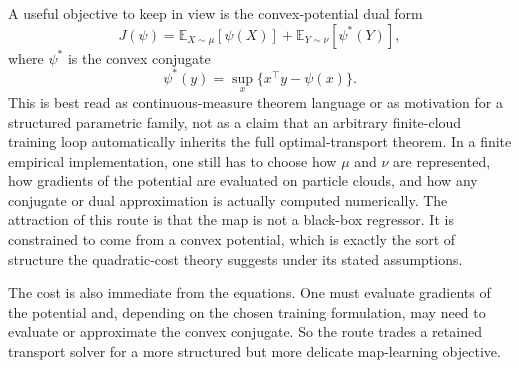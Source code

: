 A useful objective to keep in view is the convex-potential dual form
\begin{equation}
\label{eq:bf-neural-ot-direct-dual-objective}
  J(\psi)
  =
  \mathbb E_{X\sim\mu}[\psi(X)]
  +
  \mathbb E_{Y\sim\nu}[\psi^*(Y)],
\end{equation}
where \(\psi^*\) is the convex conjugate
\begin{equation}
\label{eq:bf-neural-ot-direct-conjugate}
  \psi^*(y)=\sup_x\{x^\top y-\psi(x)\}.
\end{equation}
This is best read as continuous-measure theorem language or as motivation for a
structured parametric family, not as a claim that an arbitrary finite-cloud
training loop automatically inherits the full optimal-transport theorem.  In a
finite empirical implementation, one still has to choose how \(\mu\) and \(\nu\)
are represented, how gradients of the potential are evaluated on particle clouds,
and how any conjugate or dual approximation is actually computed numerically.
The attraction of this route is that the map is not a black-box regressor.  It is
constrained to come from a convex potential, which is exactly the sort of
structure the quadratic-cost theory suggests under its stated assumptions.

The cost is also immediate from the equations.  One must evaluate gradients of
the potential and, depending on the chosen training formulation, may need to
evaluate or approximate the convex conjugate.  So the route trades a retained
transport solver for a more structured but more delicate map-learning objective.

